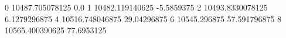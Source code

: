 0 10487.705078125 0.0
1 10482.119140625 -5.5859375
2 10493.8330078125 6.1279296875
4 10516.748046875 29.04296875
6 10545.296875 57.591796875
8 10565.400390625 77.6953125
